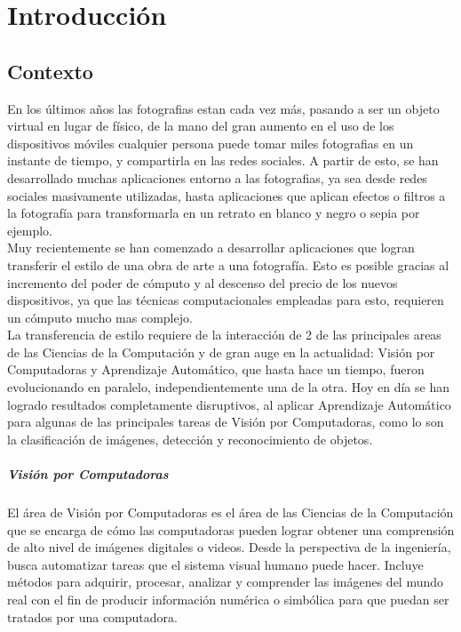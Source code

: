 \documentclass[a4paper,11pt,spanish]{book}
\begin{document}
\tableofcontents 

\chapter{Introducción}
  \section {Contexto}
    En los últimos años las fotografias estan cada vez más, pasando a ser un objeto virtual en lugar de físico, de la mano del gran aumento en el uso de los dispositivos móviles 
    cualquier persona puede tomar miles fotografias en un instante de tiempo, y compartirla en las redes sociales.
    A partir de esto, se han desarrollado muchas aplicaciones entorno a las fotografias, ya sea desde redes sociales masivamente utilizadas, hasta aplicaciones que aplican efectos o filtros 
    a la fotografía para transformarla en un retrato en blanco y negro o sepia por ejemplo. \\
    Muy recientemente se han comenzado a desarrollar aplicaciones que logran transferir el estilo de una obra de arte a una fotografía. Esto es posible gracias al incremento 
    del poder de cómputo y al descenso del precio de los nuevos dispositivos, ya que las técnicas computacionales empleadas para esto, requieren un cómputo mucho mas complejo.\\
    La transferencia de estilo requiere de la interacción de 2 de las principales areas de las Ciencias de la Computación y de gran auge en la actualidad: Visión por Computadoras y Aprendizaje Automático,
    que hasta hace un tiempo, fueron evolucionando en paralelo, independientemente una de la otra. Hoy en día se han logrado resultados completamente disruptivos, al aplicar
    Aprendizaje Automático para algunas de las principales tareas de Visión por Computadoras, como lo son la clasificación de imágenes, detección y reconocimiento de objetos.\\
    \paragraph{Visión por Computadoras}
      El área de Visión por Computadoras es el área de las Ciencias de la Computación que se encarga de cómo las computadoras pueden lograr obtener una comprensión de alto nivel de imágenes digitales o videos. 
      Desde la perspectiva de la ingeniería, busca automatizar tareas que el sistema visual humano puede hacer. Incluye métodos para adquirir, procesar, analizar y comprender las imágenes del mundo real 
      con el fin de producir información numérica o simbólica para que puedan ser tratados por una computadora.\\
\end{document}

